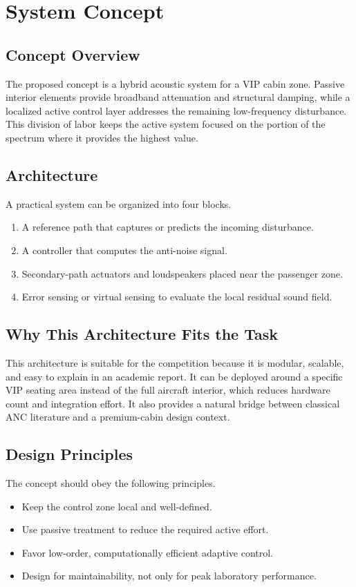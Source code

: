 \chapter{System Concept}

\section{Concept Overview}
The proposed concept is a hybrid acoustic system for a VIP cabin zone. Passive interior elements provide broadband attenuation and structural damping, while a localized active control layer addresses the remaining low-frequency disturbance. This division of labor keeps the active system focused on the portion of the spectrum where it provides the highest value.

\section{Architecture}
A practical system can be organized into four blocks.
\begin{enumerate}
    \item A reference path that captures or predicts the incoming disturbance.
    \item A controller that computes the anti-noise signal.
    \item Secondary-path actuators and loudspeakers placed near the passenger zone.
    \item Error sensing or virtual sensing to evaluate the local residual sound field.
\end{enumerate}

\section{Why This Architecture Fits the Task}
This architecture is suitable for the competition because it is modular, scalable, and easy to explain in an academic report. It can be deployed around a specific VIP seating area instead of the full aircraft interior, which reduces hardware count and integration effort. It also provides a natural bridge between classical ANC literature and a premium-cabin design context.

\section{Design Principles}
The concept should obey the following principles.
\begin{itemize}
    \item Keep the control zone local and well-defined.
    \item Use passive treatment to reduce the required active effort.
    \item Favor low-order, computationally efficient adaptive control.
    \item Design for maintainability, not only for peak laboratory performance.
\end{itemize}
